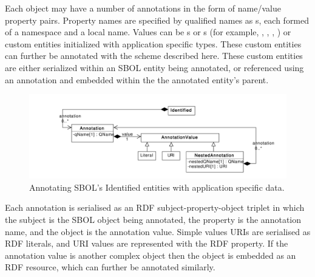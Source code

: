 Each  object may have a number of annotations in the form of name/value property pairs. Property names are specified by qualified names as s, each formed of a namespace and a local name. Values can be s or s (for example, , , , ) or custom  entities initialized with application specific types. These custom  entities can further be annotated with the scheme described here. These custom entities are either serialized within an SBOL entity being annotated, or referenced using an  annotation and embedded within the the annotated entity's parent.%

\begin{figure}[!ht]
\begin{center}


\includegraphics[scale=0.6]{uml/identified_annotations}
\caption[]{Annotating SBOL's Identified entities with application specific data.}
\label{uml:identified_annotations}
\end{center}
\end{figure}

  Each annotation is serialised as an RDF subject-property-object triplet in which the subject is the SBOL object being annotated, the property is the annotation name, and the object is the annotation value. Simple values URIs are serialised as RDF literals, and URI values are represented with the  RDF property. If the annotation value is another complex object then the object is embedded as an RDF resource, which can further be annotated similarly.%

